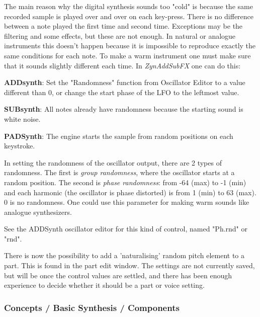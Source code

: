    The main reason why the digital synthesis sounds too "cold" is because the
   same recorded sample is played over and over on each key-press.  There is
   no difference between a note played the first time and second time.
   Exceptions may be the filtering and some effects, but these are not
   enough. In natural or analogue instruments this doesn't happen because
   it is impossible to reproduce exactly the same conditions for each
   note. To make a warm instrument one must make sure that it sounds
   slightly different each time. In \textsl{ZynAddSubFX}
   one can do this:

   \begin{enumber}
      \item \textbf{ADDsynth}:
      Set the "Randomness" function from Oscillator Editor
      to a value different than 0, or change the start phase of the LFO to
      the leftmost value.
      \item \textbf{SUBsynth}:
      All notes already have randomness because the
      starting sound is white noise.
      \item \textbf{PADSynth}:
      The engine starts the sample from random positions
      on each keystroke.
   \end{enumber}

   In setting the randomness of the oscillator output, there are 2 types of
   randomness. The first is \textsl{group randomness}, where the oscillator
   starts at a random position. The second is \textsl{phase randomness}:
   from -64 (max) to -1 (min) and each harmonic (the oscillator is phase
   distorted) is from 1 (min) to 63 (max). 0 is no randomness. One
   could use this parameter for making warm sounds like analogue
   synthesizers.

   See the ADDSynth oscillator editor for this kind of
   control, named "Ph.rnd" or "rnd".

   There is now the possibility to add a 'naturalising' random pitch element
   to a part. This is found in the part edit window. The settings are not
   currently saved, but will be once the control values are settled, and
   there has been enough experience to decide whether it should be a part or
   voice setting.

\subsubsection{Concepts / Basic Synthesis / Components}
\label{subsubsec:concepts_basics_components}

